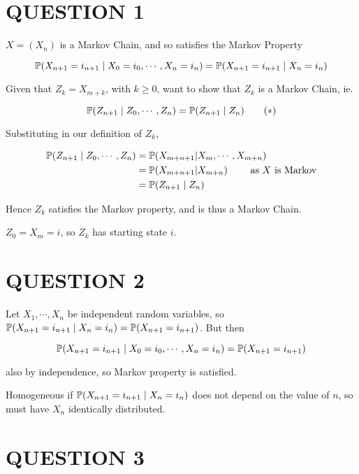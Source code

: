 \documentclass[a4paper]{article}
\begin{document}
	
\maketitle

\section{QUESTION 1}

$ X = (X_{n}) $ is a Markov Chain, and so satisfies the Markov Property

\[ \P( X_{n+1} = i_{n+1} \; | \; X_{0} = i_{0}, \cdots, X_{n} = i_{n} ) = \P(X_{n+1} = i_{n+1} \; | \; X_{n} = i_{n} ) \]

Given that $ Z_{k} = X_{m+k} $, with $ k \geq 0 $, want to show that $ Z_{k} $ is a Markov Chain, ie.

\[ \P(Z_{n+1}  \; | \; Z_{0},\cdots,Z_{n} ) = \P(Z_{n+1} \; | \; Z_{n} ) \qquad (*) \]

Substituting in our definition of $ Z_{k} $,

\begin{align*}
\P(Z_{n+1}  \; | \; Z_{0},\cdots,Z_{n} ) & = \P(X_{m+n+1}|X_{m},\cdots,X_{m+n}) \\
& = \P(X_{m+n+1} | X_{m+n}) \qquad \text{ as } X \text{ is Markov}\\
& = \P(Z_{n+1} \; | \; Z_{n} )
\end{align*}

Hence $ Z_{k} $ satisfies the Markov property, and is thus a Markov Chain.

$ Z_{0} = X_{m} = i $, so $ Z_{k} $ has starting state $ i $.

\section{QUESTION 2}

Let $ X_{1},\cdots,X_{n} $ be independent random variables, so $ \P(X_{n+1} = i_{n+1} \; | \; X_{n} = i_{n} ) = \P(X_{n+1} = i_{n+1}  ) $. But then 

\[ \P( X_{n+1} = i_{n+1} \; | \; X_{0} = i_{0}, \cdots, X_{n} = i_{n} ) = \P(X_{n+1} = i_{n+1}) \] 

also by independence, so Markov property is satisfied.

Homogeneous if $ \P(X_{n+1} = i_{n+1} \; | \; X_{n} = i_{n}) $ does not depend on the value of $ n $, so must have $ X_{n} $ identically distributed. 



\section{QUESTION 3}
\end{document}
